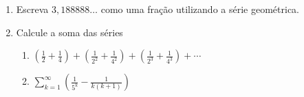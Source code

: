 \documentclass[a4paper,5pt]{amsbook}
\newcommand{\ds}{\displaystyle}
\begin{document}
\begin{enumerate}
    \item Escreva $3,188888\ldots$ como uma fra\c{c}\~ao utilizando a s\'erie
        geom\'etrica.
    
    \item Calcule a soma das s\'eries
    	\begin{enumerate}
            \setlength\itemsep{0.3cm}
    		\item $\ds\left(\frac{1}{2}+\frac{1}{4}\right)+\left(\frac{1}{2^2}+\frac{1}{4^2}\right)+\left(\frac{1}{2^3}+\frac{1}{4^3}\right)+\cdots$
    		\item $\ds\sum_{k=1}^\infty \left(\frac{1}{5^k} - \frac{1}{k(k+1)}\right)$
    	\end{enumerate}
\end{enumerate}
\end{document}

